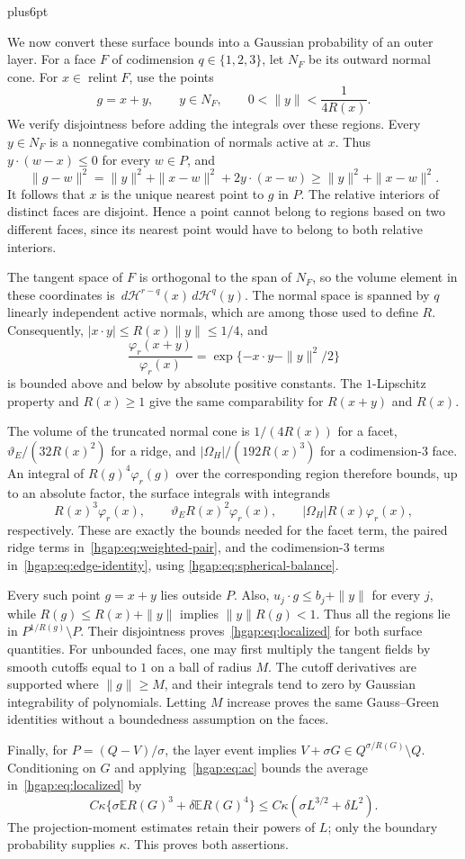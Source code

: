 \documentclass[11pt,letterpaper,twoside,leqno]{article}
\makeatletter
\theoremstyle{bookplain}
\theoremstyle{bookremark}
\renewenvironment{proof}[1][\proofname]{\par
  \pushQED{\qed}\normalfont\topsep6pt plus6pt\relax
  \trivlist\item[\hskip\labelsep\bfseries #1\@addpunct{.}]\ignorespaces
}{\popQED\endtrivlist\@endpefalse}
\newcommand{\E}{\mathbb E}
\newcommand{\dd}{\,d}
\makeatother
\begin{document}
\begin{proof}
We now convert these surface bounds into a Gaussian probability of
an outer layer. For a face $F$ of codimension $q\in\{1,2,3\}$, let
$N_F$ be its outward normal cone. For $x\in\operatorname{relint}F$,
use the points
\[
 g=x+y,\qquad y\in N_F,\qquad 0<\|y\|<\frac1{4R(x)}.
\]
We verify disjointness before adding the integrals over these regions.
Every $y\in N_F$ is a nonnegative combination of normals active at
$x$. Thus $y\cdot(w-x)\le0$ for every $w\in P$, and
\[
 \|g-w\|^2=\|y\|^2+\|x-w\|^2+2y\cdot(x-w)
              \ge\|y\|^2+\|x-w\|^2.
\]
It follows that $x$ is the unique nearest point to $g$ in $P$.
The relative interiors of distinct faces are disjoint. Hence a point
cannot belong to regions based on two different faces, since its
nearest point would have to belong to both relative interiors.

The tangent space of $F$ is orthogonal to the span of $N_F$, so the
volume element in these coordinates is
$\dd\mathcal H^{r-q}(x)\dd\mathcal H^q(y)$.
The normal space is spanned by $q$ linearly independent active
normals, which are among those used to define $R$. Consequently,
$|x\cdot y|\le R(x)\|y\|\le1/4$, and
\[
 \frac{\varphi_r(x+y)}{\varphi_r(x)}
       =\exp\{-x\cdot y-\|y\|^2/2\}
\]
is bounded above and below by absolute positive constants. The
$1$-Lipschitz property and $R(x)\ge1$ give the same comparability for
$R(x+y)$ and $R(x)$.

The volume of the truncated normal cone is
$1/(4R(x))$ for a facet,
$\vartheta_E/(32R(x)^2)$ for a ridge, and
$|\Omega_H|/(192R(x)^3)$ for a codimension-$3$ face.
An integral of $R(g)^4\varphi_r(g)$ over the corresponding region
therefore bounds, up to an absolute factor, the surface integrals with
integrands
\[
 R(x)^3\varphi_r(x),\qquad
 \vartheta_E R(x)^2\varphi_r(x),\qquad
 |\Omega_H|R(x)\varphi_r(x),
\]
respectively. These are exactly the bounds needed for the facet term,
the paired ridge terms in~\eqref{hgap:eq:weighted-pair}, and the
codimension-$3$ terms in~\eqref{hgap:eq:edge-identity}, using
\eqref{hgap:eq:spherical-balance}.

Every such point $g=x+y$ lies outside $P$. Also,
$u_j\cdot g\le b_j+\|y\|$ for every $j$, while
$R(g)\le R(x)+\|y\|$ implies $\|y\|R(g)<1$.
Thus all the regions lie in $P^{1/R(g)}\setminus P$.
Their disjointness proves~\eqref{hgap:eq:localized} for both surface
quantities. For unbounded faces, one may first multiply the tangent
fields by smooth cutoffs equal to $1$ on a ball of radius $M$.
The cutoff derivatives are supported where $\|g\|\ge M$, and their
integrals tend to zero by Gaussian integrability of polynomials.
Letting $M$ increase proves the same Gauss--Green identities without
a boundedness assumption on the faces.

Finally, for $P=(Q-V)/\sigma$, the layer event implies
$V+\sigma G\in Q^{\sigma/R(G)}\setminus Q$.
Conditioning on $G$ and applying~\eqref{hgap:eq:ac} bounds
the average in~\eqref{hgap:eq:localized} by
\[
 C\kappa\{\sigma\E R(G)^3+\delta\E R(G)^4\}
 \le C\kappa(\sigma L^{3/2}+\delta L^2).
\]
The projection-moment estimates retain their powers of $L$; only the
boundary probability supplies $\kappa$. This proves both assertions.
\end{proof}
\end{document}

